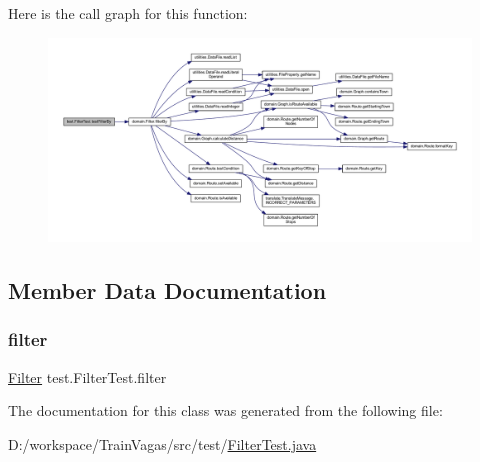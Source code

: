 Here is the call graph for this function\+:\nopagebreak
\begin{figure}[H]
\begin{center}
\leavevmode
\includegraphics[width=350pt]{classtest_1_1_filter_test_abd2f49938ef9663ecee1953d09bae933_cgraph}
\end{center}
\end{figure}


\subsection{Member Data Documentation}
\mbox{\label{classtest_1_1_filter_test_ac79abdc8770b75af63e5b8cc190c42c6}} 
\subsubsection{\texorpdfstring{filter}{filter}}
{\footnotesize\ttfamily \hyperlink{classdomain_1_1_filter}{Filter} test.\+Filter\+Test.\+filter\hspace{0.3cm}{\ttfamily [package]}}



The documentation for this class was generated from the following file\+:\begin{DoxyCompactItemize}
\item 
D\+:/workspace/\+Train\+Vagas/src/test/\hyperlink{_filter_test_8java}{Filter\+Test.\+java}\end{DoxyCompactItemize}
